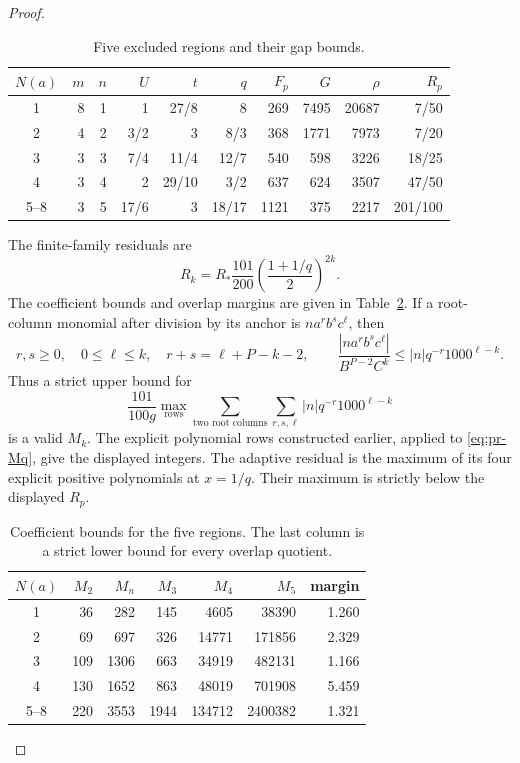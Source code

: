 \documentclass[12pt]{article}
\numberwithin{equation}{section}
\begin{document}
\begin{proof}
\begin{table}[htbp]
\centering\small
\caption{Five excluded regions and their gap bounds.}
\label{tab:pr-five-regions}
\begin{tabular}{c|rrrrrrrrr}
\(N(a)\)&\(m\)&\(n\)&\(U\)&\(t\)&\(q\)&\(F_p\)&\(G\)&\(\rho\)&\(R_p\)\\\hline
1&8&1&1&27/8&8&269&7495&20687&7/50\\
2&4&2&3/2&3&8/3&368&1771&7973&7/20\\
3&3&3&7/4&11/4&12/7&540&598&3226&18/25\\
4&3&4&2&29/10&3/2&637&624&3507&47/50\\
5--8&3&5&17/6&3&18/17&1121&375&2217&201/100
\end{tabular}
\end{table}
The finite-family residuals are
\begin{equation*}
 R_k=R_*\frac{101}{200}
             \left(\frac{1+1/q}{2}\right)^{2k}.
\end{equation*}
The coefficient bounds and overlap margins are given in
Table~\ref{tab:pr-five-coefficients}. If a root-column monomial after division by its
anchor is \(n a^r b^s c^\ell\), then
\[
 r,s\ge0,\quad0\le\ell\le k,\quad r+s=\ell+P-k-2,
 \qquad
 \frac{|n a^r b^s c^\ell|}{B^{P-2}C^k}
 \le |n|q^{-r}1000^{\ell-k}.
\]
Thus a strict upper bound for
\begin{equation}\label{eq:pr-Mq}
 \frac{101}{100g}\max_{\text{rows}}
       \sum_{\text{two root columns}}\sum_{r,s,\ell}
                    |n|q^{-r}1000^{\ell-k}
\end{equation}
is a valid \(M_k\). The explicit polynomial rows constructed earlier,
applied to \eqref{eq:pr-Mq}, give the displayed integers.
The adaptive residual is the maximum of its four explicit positive
polynomials at $x=1/q$. Their maximum is strictly below the displayed
\(R_p\).
\begin{table}[htbp]
\centering\small
\caption{Coefficient bounds for the five regions. The last column is a
strict lower bound for every overlap quotient.}
\label{tab:pr-five-coefficients}
\begin{tabular}{c|rrrrrr}
\(N(a)\)&\(M_2\)&\(M_n\)&\(M_3\)&\(M_4\)&\(M_5\)&margin\\\hline
1&36&282&145&4605&38390&1.260\\
2&69&697&326&14771&171856&2.329\\
3&109&1306&663&34919&482131&1.166\\
4&130&1652&863&48019&701908&5.459\\
5--8&220&3553&1944&134712&2400382&1.321
\end{tabular}
\end{table}


\end{proof}
\end{document}
